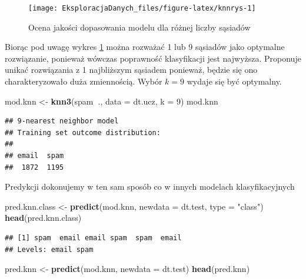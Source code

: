 \documentclass[]{book}
\newenvironment{Shaded}{\begin{snugshade}}{\end{snugshade}}
\newcommand{\DataTypeTok}[1]{\textcolor[rgb]{0.13,0.29,0.53}{#1}}
\newcommand{\DecValTok}[1]{\textcolor[rgb]{0.00,0.00,0.81}{#1}}
\newcommand{\KeywordTok}[1]{\textcolor[rgb]{0.13,0.29,0.53}{\textbf{#1}}}
\newcommand{\NormalTok}[1]{#1}
\newcommand{\OperatorTok}[1]{\textcolor[rgb]{0.81,0.36,0.00}{\textbf{#1}}}
\newcommand{\StringTok}[1]{\textcolor[rgb]{0.31,0.60,0.02}{#1}}
\theoremstyle{plain}
\theoremstyle{definition}
\theoremstyle{definition}
\theoremstyle{definition}
\theoremstyle{definition}
\theoremstyle{remark}
\begin{document}
\begin{figure}

{\centering \texttt{[image: EksploracjaDanych\_files/figure-latex/knnrys-1]} 

}

\caption{Ocena jakości dopasowania modelu dla różnej liczby sąsiadów}\label{fig:knnrys}
\end{figure}

Biorąc pod uwagę wykres \ref{fig:knnrys} można rozważać 1 lub 9 sąsiadów jako optymalne rozwiązanie, ponieważ wówczas poprawność klasyfikacji jest najwyższa. Proponuje unikać rozwiązania z 1 najbliższym sąsiadem ponieważ, będzie się ono charakteryzowało duża zmiennością. Wybór \(k=9\) wydaje się być optymalny.

\begin{Shaded}
\begin{Highlighting}[]
\NormalTok{mod.knn <-}\StringTok{ }\KeywordTok{knn3}\NormalTok{(spam}\OperatorTok{~}\NormalTok{., }\DataTypeTok{data =}\NormalTok{ dt.ucz,}
                \DataTypeTok{k =} \DecValTok{9}\NormalTok{)}
\NormalTok{mod.knn}
\end{Highlighting}
\end{Shaded}

\begin{verbatim}
## 9-nearest neighbor model
## Training set outcome distribution:
## 
## email  spam 
##  1872  1195
\end{verbatim}

Predykcji dokonujemy w ten sam sposób co w innych modelach klasyfikacyjnych

\begin{Shaded}
\begin{Highlighting}[]
\NormalTok{pred.knn.class <-}\StringTok{ }\KeywordTok{predict}\NormalTok{(mod.knn, }\DataTypeTok{newdata =}\NormalTok{ dt.test, }\DataTypeTok{type =} \StringTok{"class"}\NormalTok{)}
\KeywordTok{head}\NormalTok{(pred.knn.class)}
\end{Highlighting}
\end{Shaded}

\begin{verbatim}
## [1] spam  email email spam  spam  email
## Levels: email spam
\end{verbatim}

\begin{Shaded}
\begin{Highlighting}[]
\NormalTok{pred.knn <-}\StringTok{ }\KeywordTok{predict}\NormalTok{(mod.knn, }\DataTypeTok{newdata =}\NormalTok{ dt.test)}
\KeywordTok{head}\NormalTok{(pred.knn)}
\end{Highlighting}
\end{Shaded}
\end{document}
